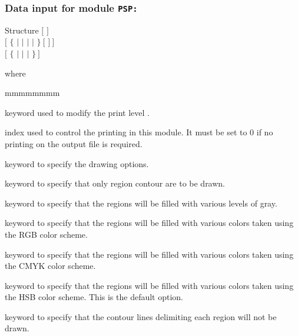\subsubsection{Data input for module {\tt PSP:}}\label{sect:PSPdesc}

\begin{DataStructure}{Structure }
$[$   $]$ \\
$[$  $\{$  $|$  $|$  $|$  $|$  $\}~[$  $]~]$ \\
$[$  $\{$  $|$  $|$  $|$  $\}~]$
\end{DataStructure}

\noindent where

\begin{ListeDeDescription}{mmmmmmmm}

\item[\moc{EDIT}] keyword used to modify the print level . 

\item[\dusa{iprint}] index used to control the printing in this module. It must be set to 0 if no printing on the output 
file is required. 

\item[\moc{FILL}] keyword to specify the drawing options. 

\item[\moc{NONE}] keyword to specify that only region contour are to be drawn. 

\item[\moc{GRAY}] keyword to specify that the regions will be filled with various levels of gray. 

\item[\moc{RGB}] keyword to specify that the regions will be filled with various colors taken using the RGB color 
scheme. 

\item[\moc{CMYK}] keyword to specify that the regions will be filled with various colors taken using the CMYK 
color scheme. 

\item[\moc{HSB}] keyword to specify that the regions will be filled with various colors taken using the HSB color 
scheme. This is the default option. 

\item[\moc{NOCONTOUR}] keyword to specify that the contour lines delimiting each region will not be drawn. 


\end{ListeDeDescription}
